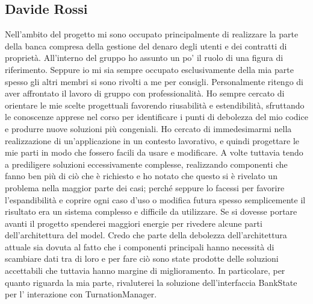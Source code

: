 \subsection{Davide Rossi}
Nell'ambito del progetto mi sono occupato principalmente di realizzare la parte della banca compresa della gestione del denaro degli utenti e
dei contratti di proprietà. All'interno del gruppo ho assunto un po' il ruolo di una figura di riferimento. 
Seppure io mi sia sempre occupato esclusivamente della mia parte spesso gli altri membri si sono rivolti a me per consigli.
Personalmente ritengo di aver affrontato il lavoro di gruppo con professionalità. 
Ho sempre cercato di orientare le mie scelte progettuali favorendo riusabilità e estendibilità, 
sfruttando le conoscenze apprese nel corso per identificare i punti di debolezza del mio codice e produrre nuove soluzioni più congeniali.
Ho cercato di immedesimarmi nella realizzazione di un’applicazione in un contesto lavorativo, 
e quindi progettare le mie parti in modo che fossero facili da usare e modificare. 
A volte tuttavia tendo a prediligere soluzioni eccessivamente complesse, 
realizzando componenti che fanno ben più di ciò che è richiesto e ho notato che 
questo si è rivelato un problema nella maggior parte dei casi; perché seppure lo facessi per favorire 
l’espandibilità e coprire ogni caso d'uso o modifica futura spesso semplicemente il risultato era un sistema complesso e difficile 
da utilizzare. 
Se si dovesse portare avanti il progetto spenderei maggiori energie per rivedere 
alcune parti dell’architettura del model. Credo che parte della debolezza 
dell’architettura attuale sia dovuta al fatto che i componenti principali hanno 
necessità di scambiare dati tra di loro e per fare ciò  sono state prodotte delle 
soluzioni accettabili che tuttavia hanno margine di miglioramento. 
In particolare, per quanto riguarda la mia parte, rivaluterei la soluzione dell'interfaccia BankState per l' interazione con
TurnationManager.
